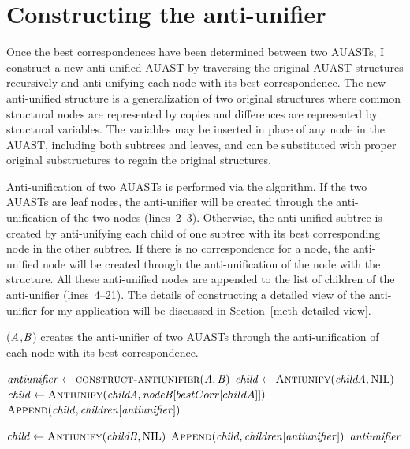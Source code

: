 \section{Constructing the anti-unifier}\label{meth-antiUnifier}\label{meth-antiunifier}
Once the best correspondences have been determined between two AUASTs, I construct a new anti-unified AUAST by traversing the original AUAST structures recursively and anti-unifying each node with its best correspondence. The new anti-unified structure is a generalization of two original structures where common structural nodes are represented by copies and differences are represented by structural variables. The variables may be inserted in place of any node in the AUAST, including both subtrees and leaves, and can be substituted with proper original substructures to regain the original structures.



Anti-unification of two AUASTs is performed via the  algorithm. If the two AUASTs are leaf nodes, the anti-unifier will be created through the anti-unification of the two nodes (lines~2--3). Otherwise, the anti-unified subtree is created by anti-unifying each child of one subtree with its best corresponding node in the other subtree. If there is no correspondence for a node, the anti-unified node will be created through the anti-unification of the node with the \NIL{} structure. All these anti-unified nodes are appended to the list of children of the anti-unifier (lines~4--21). The details of constructing a detailed view of the anti-unifier for my application will be discussed in Section~\ref{meth-detailed-view}.


\begin{algorithm}
 \caption{($\mathit{A}$,$\mathit{B}$) creates the anti-unifier of two AUASTs through the anti-unification of each node with its best correspondence.}
  \label{AntiUnify}
  \begin{algorithmic}[1]
\AntiUnify
{}
  \State $\mathit{antiunifier} \gets   \textsc{construct-antiunifier}(\mathit{A},\mathit{B})$
  \State $\mathit{child} \gets   \textsc{Antiunify}(\mathit{childA},\textrm{NIL})$
\Else	
 \State $\mathit{child} \gets   \textsc{Antiunify}(\mathit{childA},\mathit{nodeB}[bestCorr[childA]])$
\EndIf
\State $\textsc{Append}(\mathit{child},\mathit{children[antiunifier]})$
\EndFor
\EndIf

  \State $\mathit{child} \gets   \textsc{Antiunify}(\mathit{childB},\textrm{NIL})$
\EndIf
\State $\textsc{Append}(\mathit{child},\mathit{children[antiunifier]})$
\EndFor
 \EndIf
\Return $\mathit{antiunifier}$
\end{algorithmic}
\end{algorithm}

